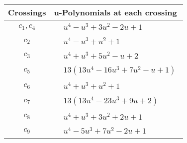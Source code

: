 \documentclass[1p]{elsarticle_modified}
\theoremstyle{definition}
\begin{document}
\begin{tabular}{m{50pt}|m{274pt}}
Crossings & \hspace{64pt}u-Polynomials at each crossing \\
\hline $$\begin{aligned}c_{1},c_{4}\end{aligned}$$&$\begin{aligned}
&u^4- u^3+3 u^2-2 u+1
\end{aligned}$\\
\hline $$\begin{aligned}c_{2}\end{aligned}$$&$\begin{aligned}
&u^4- u^3+u^2+1
\end{aligned}$\\
\hline $$\begin{aligned}c_{3}\end{aligned}$$&$\begin{aligned}
&u^4+u^3+5 u^2- u+2
\end{aligned}$\\
\hline $$\begin{aligned}c_{5}\end{aligned}$$&$\begin{aligned}
&13(13 u^4-16 u^3+7 u^2- u+1)
\end{aligned}$\\
\hline $$\begin{aligned}c_{6}\end{aligned}$$&$\begin{aligned}
&u^4+u^3+u^2+1
\end{aligned}$\\
\hline $$\begin{aligned}c_{7}\end{aligned}$$&$\begin{aligned}
&13(13 u^4-23 u^3+9 u+2)
\end{aligned}$\\
\hline $$\begin{aligned}c_{8}\end{aligned}$$&$\begin{aligned}
&u^4+u^3+3 u^2+2 u+1
\end{aligned}$\\
\hline $$\begin{aligned}c_{9}\end{aligned}$$&$\begin{aligned}
&u^4-5 u^3+7 u^2-2 u+1
\end{aligned}$\\

\end{tabular}
\end{document}
